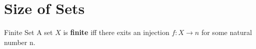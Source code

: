\section{Size of Sets}

\begin{definition}{Finite Set}{}
    A set $X$ is \textbf{finite} iff there exits an injection $f: X \to n$ for some natural number n.
\end{definition}
